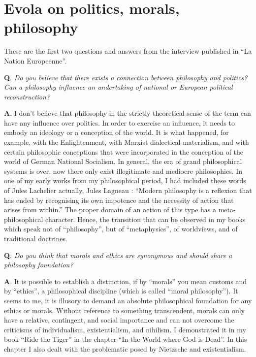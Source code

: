 \section{Evola on politics, morals, philosophy}

These are the first two questions and answers from the interview published in ``La Nation Europeenne''.

\textbf{Q}. \emph{Do you believe that there exists a connection between philosophy and politics? Can a philosophy influence an undertaking of national or European political reconstruction?}

\textbf{A}. I don't believe that philosophy in the strictly theoretical sense of the term can have any influence over politics. In order to exercise an influence, it needs to embody an ideology or a conception of the world. It is what happened, for example, with the Enlightenment, with Marxist dialectical materialism, and with certain philosophic conceptions that were incorporated in the conception of the world of German National Socialism. In general, the era of grand philosophical systems is over, now there only exist illegitimate and mediocre philosophies. In one of my early works from my philosophical period, I had included these words of Jules Lachelier actually, Jules Lagneau : ``Modern philosophy is a reflexion that has ended by recognising its own impotence and the necessity of action that arises from within.'' The proper domain of an action of this type has a meta-philosophical character. Hence, the transition that can be observed in my books which speak not of ``philosophy'', but of ``metaphysics'', of worldviews, and of traditional doctrines.

\textbf{Q}. \emph{Do you think that morals and ethics are synonymous and should share a philosophy foundation?}

\textbf{A}. It is possible to establish a distinction, if by ``morals'' you mean customs and by ``ethics'', a philosophical discipline (which is called ``moral philosophy''). It seems to me, it is illusory to demand an absolute philosophical foundation for any ethics or morals. Without reference to something transcendent, morals can only have a relative, contingent, and social importance and can not overcome the criticisms of individualism, existentialism, and nihilism. I demonstrated it in my book ``Ride the Tiger'' in the chapter ``In the World where God is Dead''. In this chapter I also dealt with the problematic posed by Nietzsche and existentialism.



